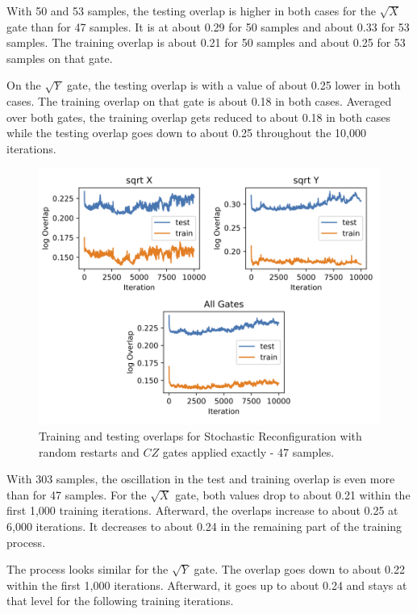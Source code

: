 With 50 and 53 samples, the testing overlap is higher in both cases for the $\sqrt{X}$ gate than for 
47 samples. It is at about 0.29 for 50 samples and about 0.33 for 53 samples. The training overlap is about 
0.21 for 50 samples and about 0.25 for 53 samples on that gate.

On the $\sqrt{Y}$ gate, the testing overlap is with a value of about 0.25 lower in both cases. The 
training overlap on that gate is about 0.18 in both cases. Averaged over both gates, the training 
overlap gets reduced to about 0.18 in both cases while the testing overlap goes down to about 0.25 
throughout the 10,000 iterations.

\begin{figure}[H]
  \centering
  \includegraphics[width=\textwidth]{figures/results/sr-restarts-not-learned/avgOverlap_47.png}
  \caption[Training and Testing Overlaps for Stochastic Reconfiguration with Random Restarts and $CZ$ Gates Applied Exactly - 47 Samples]{
  Training and testing overlaps for Stochastic Reconfiguration with random restarts and $CZ$ gates applied exactly - 47 samples.}
  \label{fig:sr_exact_overlap_47}
\end{figure}

With 303 samples, the oscillation in the test and training overlap is even more than for 47 samples. 
For the $\sqrt{X}$ gate, both values drop to about 0.21 within the first 1,000 training iterations. 
Afterward, the overlaps increase to about 0.25 at 6,000 iterations. It decreases to about 0.24 in the 
remaining part of the training process.

The process looks similar for the $\sqrt{Y}$ gate. The overlap goes down to about 0.22 within the 
first 1,000 iterations. Afterward, it goes up to about 0.24 and stays at that level for the 
following training iterations.

